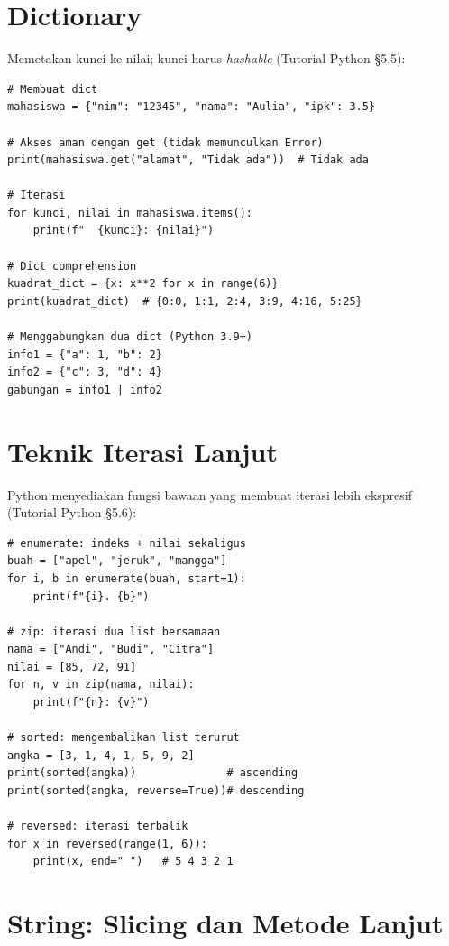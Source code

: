 \documentclass[../main.tex]{subfiles}
\begin{document}
\section{Dictionary}

Memetakan kunci ke nilai; kunci harus \textit{hashable} (Tutorial Python §5.5):

\begin{lstlisting}[caption=Dictionary: operasi lanjut]
# Membuat dict
mahasiswa = {"nim": "12345", "nama": "Aulia", "ipk": 3.5}

# Akses aman dengan get (tidak memunculkan Error)
print(mahasiswa.get("alamat", "Tidak ada"))  # Tidak ada

# Iterasi
for kunci, nilai in mahasiswa.items():
    print(f"  {kunci}: {nilai}")

# Dict comprehension
kuadrat_dict = {x: x**2 for x in range(6)}
print(kuadrat_dict)  # {0:0, 1:1, 2:4, 3:9, 4:16, 5:25}

# Menggabungkan dua dict (Python 3.9+)
info1 = {"a": 1, "b": 2}
info2 = {"c": 3, "d": 4}
gabungan = info1 | info2
\end{lstlisting}

\section{Teknik Iterasi Lanjut}

Python menyediakan fungsi bawaan yang membuat iterasi lebih ekspresif (Tutorial Python §5.6):

\begin{lstlisting}[caption=enumerate zip dan items]
# enumerate: indeks + nilai sekaligus
buah = ["apel", "jeruk", "mangga"]
for i, b in enumerate(buah, start=1):
    print(f"{i}. {b}")

# zip: iterasi dua list bersamaan
nama = ["Andi", "Budi", "Citra"]
nilai = [85, 72, 91]
for n, v in zip(nama, nilai):
    print(f"{n}: {v}")

# sorted: mengembalikan list terurut
angka = [3, 1, 4, 1, 5, 9, 2]
print(sorted(angka))              # ascending
print(sorted(angka, reverse=True))# descending

# reversed: iterasi terbalik
for x in reversed(range(1, 6)):
    print(x, end=" ")   # 5 4 3 2 1
\end{lstlisting}

\section{String: Slicing dan Metode Lanjut}
\end{document}
